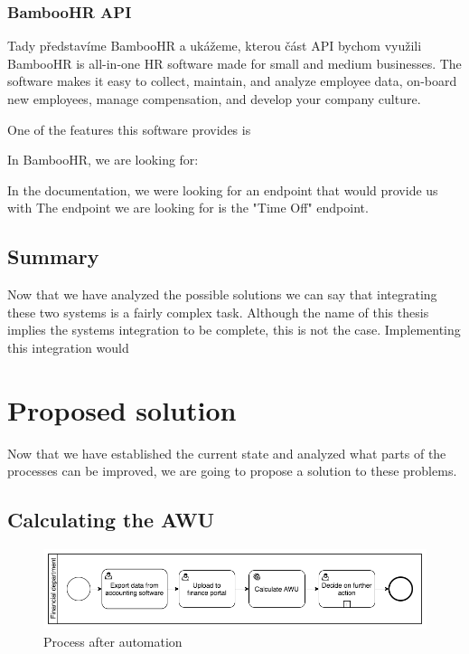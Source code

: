 \documentclass[12pt,oneside]{fithesis2}
\begin{document}
    \subsection*{BambooHR API}
    Tady představíme BambooHR a ukážeme, kterou část API bychom využili
    BambooHR is all-in-one HR software made for small and medium businesses. The software makes it easy to collect, maintain, and analyze employee data, on-board new employees, manage compensation, and develop your company culture.\cite{bambooHR}
    
    One of the features this software provides is 
    
    In BambooHR, we are looking for: 
    
    In the documentation, we were looking for an endpoint that would provide us with 
    The endpoint we are looking for is the "Time Off" endpoint.
    \section{Summary}
    Now that we have analyzed the possible solutions we can say that integrating these two systems is a fairly complex task. Although the name of this thesis implies the systems integration to be complete, this is not the case. Implementing this integration would 
    

    
    \chapter{Proposed solution}
    Now that we have established the current state and analyzed what parts of the processes can be improved, we are going to propose a solution to these problems.
    \section{Calculating the AWU}
    
    \begin{figure}[ht]
        \centering
        \includegraphics[width=\textwidth]{after_automation.png}
        \caption{Process after automation}
        \label{fig:after_automation}
    \end{figure}
    
\end{document}
